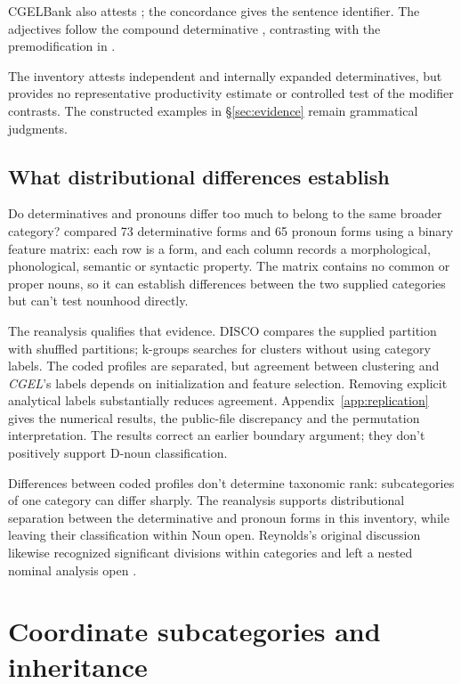 \documentclass[12pt]{article}
\begin{document}
CGELBank also attests ; the concordance gives the sentence identifier. The adjectives follow the compound determinative , contrasting with the premodification in .

The inventory attests independent and internally expanded determinatives, but provides no representative productivity estimate or controlled test of the modifier contrasts. The constructed examples in §\ref{sec:evidence} remain grammatical judgments.

\subsection{What distributional differences establish}

Do determinatives and pronouns differ too much to belong to the same broader category? \textcite{reynolds2021} compared 73 determinative forms and 65 pronoun forms using a binary feature matrix: each row is a form, and each column records a morphological, phonological, semantic or syntactic property. The matrix contains no common or proper nouns, so it can establish differences between the two supplied categories but can't test nounhood directly.

The reanalysis qualifies that evidence. DISCO compares the supplied partition with shuffled partitions; k-groups searches for clusters without using category labels. The coded profiles are separated, but agreement between clustering and \textit{CGEL}'s labels depends on initialization and feature selection. Removing explicit analytical labels substantially reduces agreement. Appendix~\ref{app:replication} gives the numerical results, the public-file discrepancy and the permutation interpretation. The results correct an earlier boundary argument; they don't positively support D-noun classification.

Differences between coded profiles don't determine taxonomic rank: subcategories of one category can differ sharply. The reanalysis supports distributional separation between the determinative and pronoun forms in this inventory, while leaving their classification within Noun open. Reynolds's original discussion likewise recognized significant divisions within categories and left a nested nominal analysis open \citep{reynolds2021}.

\section{Coordinate subcategories and inheritance}\label{sec:inheritance}
\end{document}
